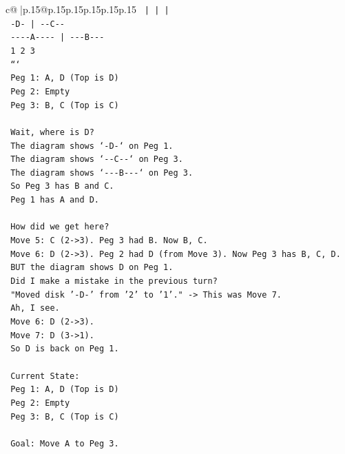 \documentclass{article}
\begin{document}
{\begin{supertabular}{c@{$\;$}|p{.15\linewidth}@{}p{.15\linewidth}p{.15\linewidth}p{.15\linewidth}p{.15\linewidth}p{.15\linewidth}}
{{{\texttt{        |         |         |    } \\
\texttt{       {-}D{-}        |       {-}{-}C{-}{-}  } \\
\texttt{    {-}{-}{-}{-}A{-}{-}{-}{-}     |      {-}{-}{-}B{-}{-}{-} } \\
\texttt{        1         2         3    } \\
\texttt{    ```} \\
\texttt{    Peg 1: A, D (Top is D)} \\
\texttt{    Peg 2: Empty} \\
\texttt{    Peg 3: B, C (Top is C)} \\
\\ 
\texttt{    Wait, where is D?} \\
\texttt{    The diagram shows `{-}D{-}` on Peg 1.} \\
\texttt{    The diagram shows `{-}{-}C{-}{-}` on Peg 3.} \\
\texttt{    The diagram shows `{-}{-}{-}B{-}{-}{-}` on Peg 3.} \\
\texttt{    So Peg 3 has B and C.} \\
\texttt{    Peg 1 has A and D.} \\
\\ 
\texttt{    How did we get here?} \\
\texttt{    Move 5: C (2{-}>3). Peg 3 had B. Now B, C.} \\
\texttt{    Move 6: D (2{-}>3). Peg 2 had D (from Move 3). Now Peg 3 has B, C, D.} \\
\texttt{    BUT the diagram shows D on Peg 1.} \\
\texttt{    Did I make a mistake in the previous turn?} \\
\texttt{    "Moved disk '{-}D{-}' from '2' to '1'." {-}> This was Move 7.} \\
\texttt{    Ah, I see.} \\
\texttt{    Move 6: D (2{-}>3).} \\
\texttt{    Move 7: D (3{-}>1).} \\
\texttt{    So D is back on Peg 1.} \\
\\ 
\texttt{    Current State:} \\
\texttt{    Peg 1: A, D (Top is D)} \\
\texttt{    Peg 2: Empty} \\
\texttt{    Peg 3: B, C (Top is C)} \\
\\ 
\texttt{    Goal: Move A to Peg 3.} \\
}}}
\end{supertabular}}
\end{document}
